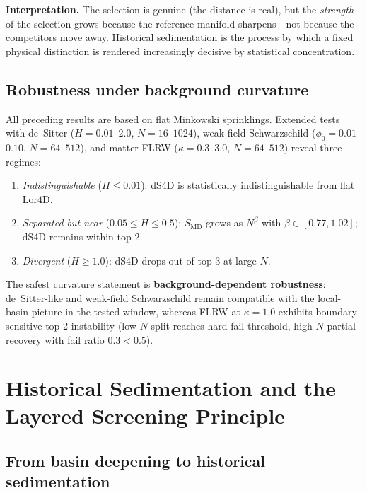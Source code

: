 \documentclass[12pt,a4paper]{article}
\newcommand{\SMD}{S_{\mathrm{MD}}}
\newcommand{\Lor}{\mathrm{Lor4D}}
\begin{document}
\textbf{Interpretation.}
The selection is genuine (the distance is real), but the \emph{strength} of the
selection grows because the reference manifold sharpens---not because the
competitors move away.
Historical sedimentation is the process by which a fixed physical distinction is
rendered increasingly decisive by statistical concentration.

\subsection{Robustness under background curvature}
\label{sec:curvature}

All preceding results are based on flat Minkowski sprinklings.
Extended tests with de~Sitter ($H=0.01$--$2.0$, $N=16$--$1024$),
weak-field Schwarzschild ($\phi_0=0.01$--$0.10$, $N=64$--$512$), and
matter-FLRW ($\kappa=0.3$--$3.0$, $N=64$--$512$) reveal three regimes:

\begin{enumerate}
\item \emph{Indistinguishable} ($H\leq 0.01$): dS4D is statistically
  indistinguishable from flat $\Lor$.
\item \emph{Separated-but-near} ($0.05\leq H\leq 0.5$): $\SMD$ grows as
  $N^\beta$ with $\beta\in[0.77,1.02]$; dS4D remains within top-2.
\item \emph{Divergent} ($H\geq 1.0$): dS4D drops out of top-3 at large $N$.
\end{enumerate}

The safest curvature statement is \textbf{background-dependent robustness}:
de~Sitter-like and weak-field Schwarzschild remain compatible with the
local-basin picture in the tested window, whereas FLRW at $\kappa=1.0$ exhibits
boundary-sensitive top-2 instability (low-$N$ split reaches hard-fail threshold,
high-$N$ partial recovery with fail ratio $0.3<0.5$).

\section{Historical Sedimentation and the Layered Screening Principle}
\label{sec:sedimentation}

\subsection{From basin deepening to historical sedimentation}
\end{document}
